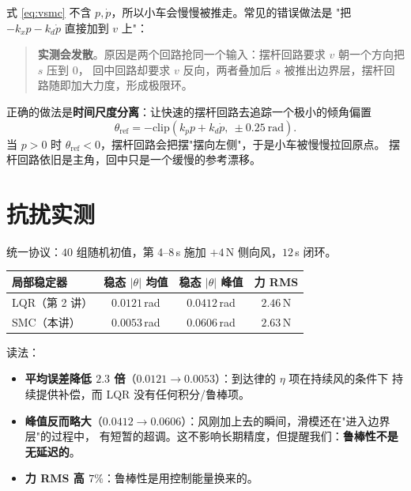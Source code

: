 式 \eqref{eq:vsmc} 不含 $p,\dot p$，所以小车会慢慢被推走。常见的错误做法是
"把 $-k_xp-k_d\dot p$ 直接加到 $v$ 上"：

\begin{quote}
\textbf{实测会发散}。原因是两个回路抢同一个输入：摆杆回路要求 $v$ 朝一个方向把 $s$ 压到 0，
回中回路却要求 $v$ 反向，两者叠加后 $s$ 被推出边界层，摆杆回路随即加大力度，形成极限环。
\end{quote}

正确的做法是\textbf{时间尺度分离}：让快速的摆杆回路去追踪一个极小的倾角偏置
\begin{equation}
  \theta_{\mathrm{ref}}=-\mathrm{clip}(k_pp+k_d\dot p,\ \pm0.25\ \mathrm{rad}).
  \label{eq:lean}
\end{equation}
当 $p>0$ 时 $\theta_{\mathrm{ref}}<0$，摆杆回路会把摆"摆向左侧"，于是小车被慢慢拉回原点。
摆杆回路依旧是主角，回中只是一个缓慢的参考漂移。


\section{抗扰实测}

统一协议：$40$ 组随机初值，第 4--8\,s 施加 $+4$\,N 侧向风，$12$\,s 闭环。

\begin{center}
\small
\begin{tabular}{@{}lccc@{}}
\toprule
局部稳定器 & 稳态 $|\theta|$ 均值 & 稳态 $|\theta|$ 峰值 & 力 RMS \\
\midrule
LQR（第 2 讲） & $0.0121$\,rad & $0.0412$\,rad & $2.46$\,N \\
SMC（本讲） & $\mathbf{0.0053}$\,rad & $0.0606$\,rad & $2.63$\,N \\
\bottomrule
\end{tabular}
\end{center}

读法：

\begin{itemize}[leftmargin=2em,itemsep=2pt]
  \item \textbf{平均误差降低 $2.3$ 倍}（$0.0121\to0.0053$）：到达律的 $\eta$ 项在持续风的条件下
        持续提供补偿，而 LQR 没有任何积分/鲁棒项。
  \item \textbf{峰值反而略大}（$0.0412\to0.0606$）：风刚加上去的瞬间，滑模还在"进入边界层"的过程中，
        有短暂的超调。这不影响长期精度，但提醒我们：\textbf{鲁棒性不是无延迟的}。
  \item \textbf{力 RMS 高 $7\%$}：鲁棒性是用控制能量换来的。
\end{itemize}

